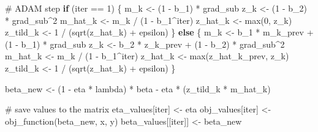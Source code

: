 \documentclass[
  letterpaper,
  DIV=11,
  numbers=noendperiod]{scrartcl}
\newenvironment{Shaded}{\begin{snugshade}}{\end{snugshade}}
\newcommand{\CommentTok}[1]{\textcolor[rgb]{0.37,0.37,0.37}{#1}}
\newcommand{\ControlFlowTok}[1]{\textcolor[rgb]{0.00,0.23,0.31}{\textbf{#1}}}
\newcommand{\DecValTok}[1]{\textcolor[rgb]{0.68,0.00,0.00}{#1}}
\newcommand{\FunctionTok}[1]{\textcolor[rgb]{0.28,0.35,0.67}{#1}}
\newcommand{\NormalTok}[1]{\textcolor[rgb]{0.00,0.23,0.31}{#1}}
\newcommand{\OtherTok}[1]{\textcolor[rgb]{0.00,0.23,0.31}{#1}}
\newcommand{\SpecialCharTok}[1]{\textcolor[rgb]{0.37,0.37,0.37}{#1}}
\begin{document}
\begin{Shaded}
\begin{Highlighting}[]
    \CommentTok{\# ADAM step}
    \ControlFlowTok{if}\NormalTok{ (iter }\SpecialCharTok{==} \DecValTok{1}\NormalTok{) \{}
\NormalTok{      m\_k }\OtherTok{\textless{}{-}}\NormalTok{ (}\DecValTok{1} \SpecialCharTok{{-}}\NormalTok{ b\_1) }\SpecialCharTok{*}\NormalTok{ grad\_sub}
\NormalTok{      z\_k }\OtherTok{\textless{}{-}}\NormalTok{ (}\DecValTok{1} \SpecialCharTok{{-}}\NormalTok{ b\_2) }\SpecialCharTok{*}\NormalTok{ grad\_sub}\SpecialCharTok{\^{}}\DecValTok{2}
\NormalTok{      m\_hat\_k }\OtherTok{\textless{}{-}}\NormalTok{ m\_k }\SpecialCharTok{/}\NormalTok{ (}\DecValTok{1} \SpecialCharTok{{-}}\NormalTok{ b\_1}\SpecialCharTok{\^{}}\NormalTok{iter)}
\NormalTok{      z\_hat\_k }\OtherTok{\textless{}{-}} \FunctionTok{max}\NormalTok{(}\DecValTok{0}\NormalTok{, z\_k)}
\NormalTok{      z\_tild\_k }\OtherTok{\textless{}{-}} \DecValTok{1} \SpecialCharTok{/}\NormalTok{ (}\FunctionTok{sqrt}\NormalTok{(z\_hat\_k) }\SpecialCharTok{+}\NormalTok{ epsilon)}
\NormalTok{    \} }\ControlFlowTok{else}\NormalTok{ \{}
\NormalTok{      m\_k }\OtherTok{\textless{}{-}}\NormalTok{ b\_1 }\SpecialCharTok{*}\NormalTok{ m\_k\_prev }\SpecialCharTok{+}\NormalTok{ (}\DecValTok{1} \SpecialCharTok{{-}}\NormalTok{ b\_1) }\SpecialCharTok{*}\NormalTok{ grad\_sub}
\NormalTok{      z\_k }\OtherTok{\textless{}{-}}\NormalTok{ b\_2 }\SpecialCharTok{*}\NormalTok{ z\_k\_prev }\SpecialCharTok{+}\NormalTok{ (}\DecValTok{1} \SpecialCharTok{{-}}\NormalTok{ b\_2) }\SpecialCharTok{*}\NormalTok{ grad\_sub}\SpecialCharTok{\^{}}\DecValTok{2}
\NormalTok{      m\_hat\_k }\OtherTok{\textless{}{-}}\NormalTok{ m\_k }\SpecialCharTok{/}\NormalTok{ (}\DecValTok{1} \SpecialCharTok{{-}}\NormalTok{ b\_1}\SpecialCharTok{\^{}}\NormalTok{iter)}
\NormalTok{      z\_hat\_k }\OtherTok{\textless{}{-}} \FunctionTok{max}\NormalTok{(z\_hat\_k\_prev, z\_k)}
\NormalTok{      z\_tild\_k }\OtherTok{\textless{}{-}} \DecValTok{1} \SpecialCharTok{/}\NormalTok{ (}\FunctionTok{sqrt}\NormalTok{(z\_hat\_k) }\SpecialCharTok{+}\NormalTok{ epsilon)}
\NormalTok{    \}}
    
\NormalTok{    beta\_new }\OtherTok{\textless{}{-}}\NormalTok{ (}\DecValTok{1} \SpecialCharTok{{-}}\NormalTok{ eta }\SpecialCharTok{*}\NormalTok{ lambda) }\SpecialCharTok{*}\NormalTok{ beta }\SpecialCharTok{{-}}\NormalTok{ eta }\SpecialCharTok{*}\NormalTok{ (z\_tild\_k }\SpecialCharTok{*}\NormalTok{ m\_hat\_k)}
    
    \CommentTok{\# save values to the matrix}
\NormalTok{    eta\_values[iter] }\OtherTok{\textless{}{-}}\NormalTok{ eta}
\NormalTok{    obj\_values[iter] }\OtherTok{\textless{}{-}} \FunctionTok{obj\_function}\NormalTok{(beta\_new, x, y)}
\NormalTok{    beta\_values[[iter]] }\OtherTok{\textless{}{-}}\NormalTok{ beta\_new}
    

\end{Highlighting}
\end{Shaded}
\end{document}
